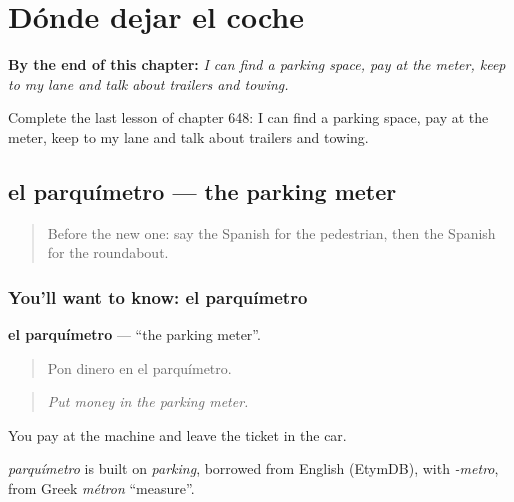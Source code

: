 
\chapter{Dónde dejar el coche}
\label{ch:es-donde-dejar-el-coche}

\begin{chapteropening}
\textbf{By the end of this chapter:} \emph{I can find a parking space, pay at the meter, keep to my lane and talk about trailers and towing.}

Complete the last lesson of chapter 648: I can find a parking space, pay at the meter, keep to my lane and talk about trailers and towing.
\end{chapteropening}

\section[el parquímetro]{el parquímetro — the parking meter}

\label{lesson:ES-C648-parquimetro}



\begin{quote}
Before the new one: say the Spanish for the pedestrian, then the Spanish for the roundabout.
\end{quote}

\subsection*{You'll want to know: el parquímetro}
\textbf{el parquímetro} — \textquotedblleft{}the parking meter\textquotedblright{}.

\begin{quote}
Pon dinero en el parquímetro.
\end{quote}

\begin{quote}
\emph{Put money in the parking meter.}
\end{quote}

You pay at the machine and leave the ticket in the car.

\begin{cousinweb}
\emph{parquímetro} is built on \emph{parking}, borrowed from English (EtymDB), with \emph{-metro}, from Greek \emph{métron} \textquotedblleft{}measure\textquotedblright{}.
\end{cousinweb}

